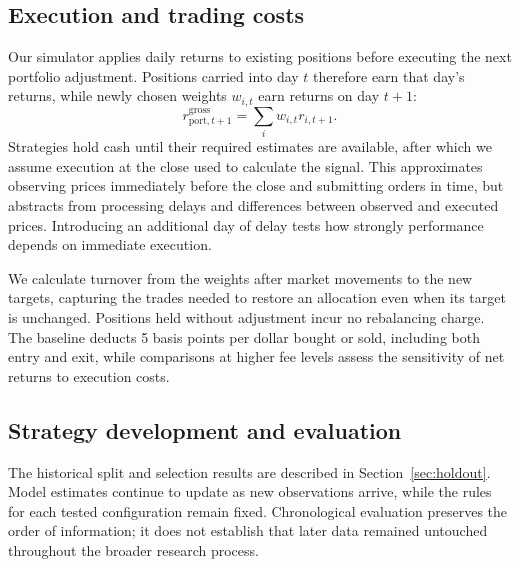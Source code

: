 \documentclass[11pt,letterpaper]{article}
\begin{document}
\subsection{Execution and trading costs}

Our simulator applies daily returns to existing positions before executing
the next portfolio adjustment. Positions carried into day \(t\) therefore
earn that day's returns, while newly chosen weights \(w_{i,t}\) earn
returns on day \(t+1\):
\[
    r_{\mathrm{port},t+1}^{\mathrm{gross}}
    = \sum_i w_{i,t}r_{i,t+1}.
\]
Strategies hold cash until their required estimates are available, after
which we assume execution at the close used to calculate the signal.
This approximates observing prices immediately before the close and
submitting orders in time, but abstracts from processing delays and
differences between observed and executed prices. Introducing an additional
day of delay tests how strongly performance depends on immediate execution.

We calculate turnover from the weights after market movements to the new
targets, capturing the trades needed to restore an allocation even when
its target is unchanged. Positions held without adjustment incur no
rebalancing charge. The baseline deducts 5 basis points per dollar bought
or sold, including both entry and exit, while comparisons at higher fee
levels assess the sensitivity of net returns to execution costs.

\subsection{Strategy development and evaluation}

The historical split and selection results are described in Section~\ref{sec:holdout}. Model estimates continue to update as new observations arrive, while the rules for each tested configuration remain fixed. Chronological evaluation preserves the order of information; it does not establish that later data remained untouched throughout the broader research process.
\end{document}
